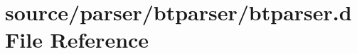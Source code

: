 \hypertarget{btparser_8d}{\section{source/parser/btparser/btparser.d File Reference}
\label{btparser_8d}
}
